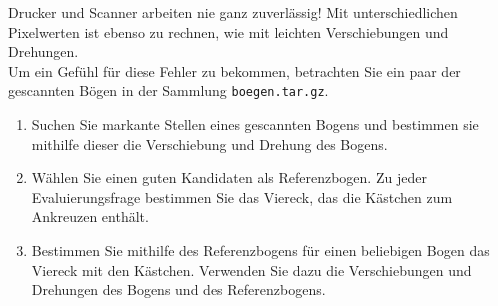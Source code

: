 \vspace{-1.5em}

Drucker und Scanner arbeiten nie ganz zuverlässig!
Mit unterschiedlichen Pixelwerten ist ebenso zu rechnen, wie mit leichten Verschiebungen und Drehungen.\\
Um ein Gefühl für diese Fehler zu bekommen, betrachten Sie ein paar der gescannten Bögen in der Sammlung \lstinline{boegen.tar.gz}.
\begin{enumerate}
\item Suchen Sie markante Stellen eines gescannten Bogens und bestimmen sie mithilfe dieser die Verschiebung und Drehung des Bogens.
\item Wählen Sie einen guten Kandidaten als Referenzbogen. Zu jeder Evaluierungsfrage bestimmen Sie das Viereck, das die Kästchen zum Ankreuzen enthält.
\item Bestimmen Sie mithilfe des Referenzbogens für einen beliebigen Bogen das Viereck mit den Kästchen. Verwenden Sie dazu die Verschiebungen und Drehungen des Bogens und des Referenzbogens.
\end{enumerate}